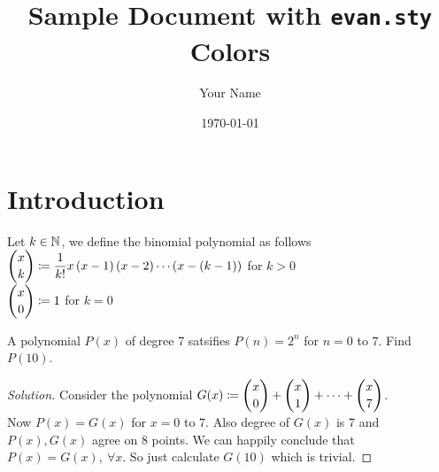 \documentclass{scrartcl} %
\title{Sample Document with \texttt{evan.sty} Colors}
\author{Your Name}
\date{\today}
\begin{document}
\maketitle
\section{Introduction}

\begin{definition}
    Let $k \in \mathbb N$, we define the binomial polynomial as follows \\
    $\dbinom{x}{k} \coloneq \dfrac{1}{k!}x\left(x-1\right)\left(x-2 \right)\cdots\left(x - \left(k - 1\right)\right)$ for $k > 0$\\
    $\dbinom{x}{0} \coloneq 1$ for $k = 0$
\end{definition}


\begin{example}[CMI A9, 2020]
	A polynomial $P(x)$ of degree 7 satsifies $P(n) = 2^n$ for $n = 0$ to $7$. Find $P(10)$.
\end{example}
\begin{proof}[Solution]
	Consider the polynomial $G(x) \coloneq \dbinom{x}{0} + \dbinom{x}{1} + \cdots + \dbinom{x}{7}$.\\
	Now $P(x) = G(x)$ for $x = 0$ to $7$. Also degree of $G(x)$ is 7 and $P(x), G(x)$ agree on 8 points. We can happily conclude that $P(x) = G(x), \ \forall x$. So just calculate $G(10)$ which is trivial.
\end{proof}
\end{document}
